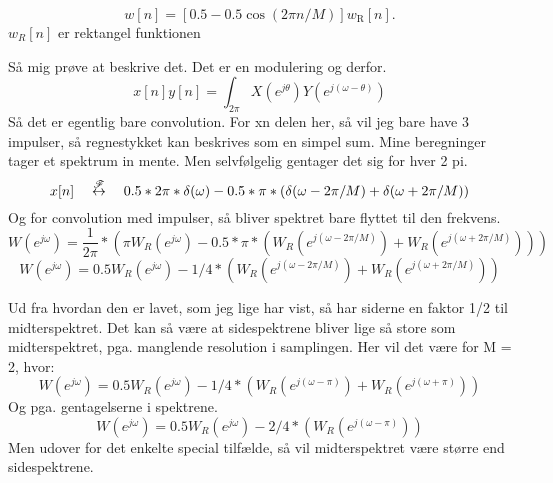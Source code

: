 \begin{Opgaver}
\begin{kapitel}
\begin{Opgave}
\begin{UnderOpgave}
            \end{UnderOpgave}
        \end{Opgave}
        \begin{Opgave}
            \[w[n]=[0.5-0.5\cos(2\pi n/M)]w_{\mathrm{R}}[n].\]     
            $w_R[n]$ er rektangel funktionen
            \begin{UnderOpgave}
                Så mig prøve at beskrive det. 
                Det er en modulering og derfor. 
                \[x[n]y[n] = \int_{2\pi}{X(e^{j\theta}) Y(e^{j (\omega - \theta)})}\]
                Så det er egentlig bare convolution. 
                For xn delen her, så vil jeg bare have 3 impulser, så regnestykket kan beskrives som en simpel sum. 
                Mine beregninger tager et spektrum in mente. Men selvfølgelig gentager det sig for hver 2 pi. 
                \[x[n] \transformation{F} 0.5 * 2\pi * \delta(\omega) - 0.5 * \pi * (\delta(\omega - 2\pi/M) + \delta(\omega + 2\pi/M))\]
                Og for convolution med impulser, så bliver spektret bare flyttet til den frekvens.
                \[W(e^{j\omega}) = \frac{1}{2\pi} * (\pi W_R(e^{j\omega}) - 0.5 * \pi * (W_R(e^{j(\omega - 2\pi/M)}) + W_R(e^{j(\omega + 2\pi/M)})))\]
                \[W(e^{j\omega}) = 0.5W_R(e^{j\omega}) - 1/4 * (W_R(e^{j(\omega - 2\pi/M)}) + W_R(e^{j(\omega + 2\pi/M)}))\]                
            \end{UnderOpgave}
            \begin{UnderOpgave}
                Ud fra hvordan den er lavet, som jeg lige har vist, så har siderne en faktor 1/2 til midterspektret. Det kan så være at sidespektrene bliver lige så store som midterspektret, pga. manglende resolution i samplingen. 
                Her vil det være for M = 2, hvor: 
                \[W(e^{j\omega}) = 0.5W_R(e^{j\omega}) - 1/4 * (W_R(e^{j(\omega - \pi)}) + W_R(e^{j(\omega + \pi)}))\]                
                Og pga. gentagelserne i spektrene. 
                \[W(e^{j\omega}) = 0.5W_R(e^{j\omega}) - 2/4 * (W_R(e^{j(\omega - \pi)}))\]                
                Men udover for det enkelte special tilfælde, så vil midterspektret være større end sidespektrene. 
            \end{UnderOpgave}
        \end{Opgave}       
    \end{kapitel}
\end{Opgaver}
